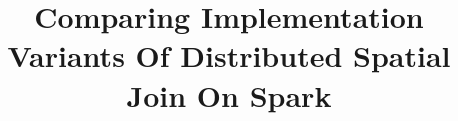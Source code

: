 \documentclass[conference]{IEEEtran}
\begin{document}
\title{Comparing Implementation Variants Of Distributed Spatial Join On Spark\\
}

\author{
}

\maketitle


\end{document}
